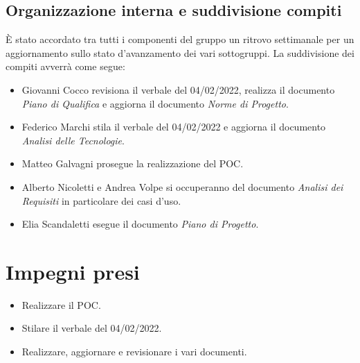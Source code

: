 \documentclass[a4paper, 12pt]{article}
\begin{document}
\subsection{Organizzazione interna e suddivisione compiti}
È stato accordato tra tutti i componenti del gruppo un ritrovo settimanale per un aggiornamento sullo stato d'avanzamento dei vari sottogruppi. La suddivisione dei compiti avverrà come segue:
\begin{itemize}
    \item Giovanni Cocco revisiona il verbale del 04/02/2022, realizza il documento \textit{Piano di Qualifica} e aggiorna il documento \textit{Norme di Progetto}.
    \item Federico Marchi stila il verbale del 04/02/2022 e aggiorna il documento \textit{Analisi delle Tecnologie}.
    \item Matteo Galvagni prosegue la realizzazione del POC.
    \item Alberto Nicoletti e Andrea Volpe si occuperanno del documento \textit{Analisi dei Requisiti} in particolare dei casi d'uso.
    \item Elia Scandaletti esegue il documento \textit{Piano di Progetto}.
\end{itemize}

\section{Impegni presi}
\begin{itemize}
\item Realizzare il POC.
\item Stilare il verbale del 04/02/2022.
\item Realizzare, aggiornare e revisionare i vari documenti.
\end{itemize}
\end{document}
